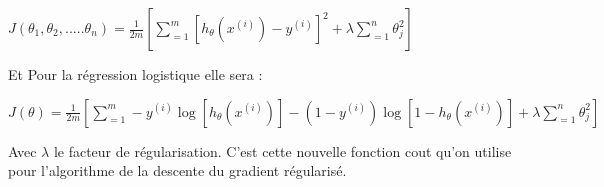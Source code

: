\begin{center}
	$J\left({\theta }_{1},{\theta }_{2},.....{\theta }_{n}\right)=\frac{1}{2m}[\sum _{=1}^{m}{\left[{h}_{\theta}\left({x}^{(i)}\right) - {y}^{(i)}\right]}^{2} + {\lambda} \sum _{=1}^{n}{{\theta}_{j}^{2}}]$
\end{center}
Et Pour la régression logistique elle sera :

\begin{center}
	$J\left({\theta }\right)=\frac{1}{2m}[\sum _{=1}^{m}-{y}^{(i)}\log [{h}_{\theta}\left({x}^{(i)}\right)] -(1-{y}^{(i)})\log [1-{h}_{\theta}\left({x}^{(i)}\right)] + {\lambda} \sum _{=1}^{n}{{\theta}_{j}^{2}}]$
\end{center}

Avec $\lambda$ le facteur de régularisation. 
C'est cette nouvelle fonction cout qu'on utilise pour l'algorithme de la descente du gradient régularisé.\\ 
